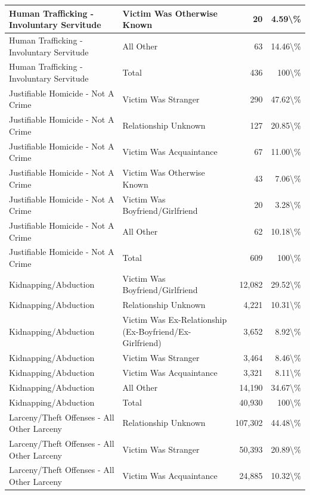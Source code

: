 \documentclass[
]{krantz}
\begin{document}
\begin{longtable}[t]{l|l|r|r}
\hline
Human Trafficking - Involuntary Servitude & Victim Was Otherwise Known & 20 & 4.59\textbackslash{}\%\\
\hline
Human Trafficking - Involuntary Servitude & All Other & 63 & 14.46\textbackslash{}\%\\
\hline
Human Trafficking - Involuntary Servitude & Total & 436 & 100\textbackslash{}\%\\
\hline
Justifiable Homicide - Not A Crime & Victim Was Stranger & 290 & 47.62\textbackslash{}\%\\
\hline
Justifiable Homicide - Not A Crime & Relationship Unknown & 127 & 20.85\textbackslash{}\%\\
\hline
Justifiable Homicide - Not A Crime & Victim Was Acquaintance & 67 & 11.00\textbackslash{}\%\\
\hline
Justifiable Homicide - Not A Crime & Victim Was Otherwise Known & 43 & 7.06\textbackslash{}\%\\
\hline
Justifiable Homicide - Not A Crime & Victim Was Boyfriend/Girlfriend & 20 & 3.28\textbackslash{}\%\\
\hline
Justifiable Homicide - Not A Crime & All Other & 62 & 10.18\textbackslash{}\%\\
\hline
Justifiable Homicide - Not A Crime & Total & 609 & 100\textbackslash{}\%\\
\hline
Kidnapping/Abduction & Victim Was Boyfriend/Girlfriend & 12,082 & 29.52\textbackslash{}\%\\
\hline
Kidnapping/Abduction & Relationship Unknown & 4,221 & 10.31\textbackslash{}\%\\
\hline
Kidnapping/Abduction & Victim Was Ex-Relationship (Ex-Boyfriend/Ex-Girlfriend) & 3,652 & 8.92\textbackslash{}\%\\
\hline
Kidnapping/Abduction & Victim Was Stranger & 3,464 & 8.46\textbackslash{}\%\\
\hline
Kidnapping/Abduction & Victim Was Acquaintance & 3,321 & 8.11\textbackslash{}\%\\
\hline
Kidnapping/Abduction & All Other & 14,190 & 34.67\textbackslash{}\%\\
\hline
Kidnapping/Abduction & Total & 40,930 & 100\textbackslash{}\%\\
\hline
Larceny/Theft Offenses - All Other Larceny & Relationship Unknown & 107,302 & 44.48\textbackslash{}\%\\
\hline
Larceny/Theft Offenses - All Other Larceny & Victim Was Stranger & 50,393 & 20.89\textbackslash{}\%\\
\hline
Larceny/Theft Offenses - All Other Larceny & Victim Was Acquaintance & 24,885 & 10.32\textbackslash{}\%\\

\end{longtable}
\end{document}
